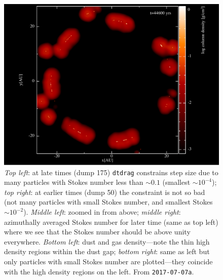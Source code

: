\documentclass[usenatbib,a4paper,times,fleqn]{mnras}
\begin{document}
\begin{figure}
\begin{center}
      \includegraphics[width=0.48\columnwidth]{figs/dtdrag_bad_density_low_Stokes_particles.pdf}
      \caption{\textit{Top left}: at late times (dump 175) \texttt{dtdrag}
         constrains step size due to many particles with Stokes number less than
         $\sim 0.1$ (smallest $\sim 10^{-4}$); \textit{top right}: at earlier
         times (dump 50) the constraint is not so bad (not many particles with
         small Stokes number, and smallest Stokes $\sim 10^{-2}$).
         \textit{Middle left}: zoomed in from above; \textit{middle right}:
         azimuthally averaged Stokes number for later time (same as top left)
         where we see that the Stokes number should be above unity everywhere.
         \textit{Bottom left}: dust and gas density---note the thin high density
         regions within the dust gap; \textit{bottom right}: same as left but
         only particles with small Stokes number are plotted---they coincide
         with the high density regions on the left. From
      \texttt{2017-07-07a}.}
      \label{fig:dtdrag}
   \end{center}
\end{figure}
\end{document}
